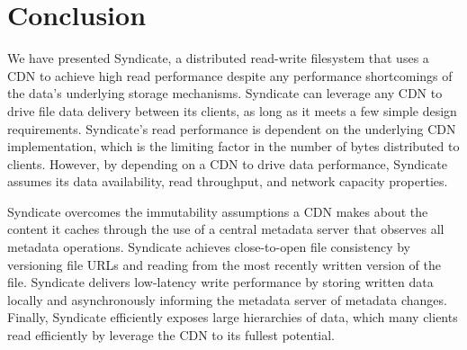\section{Conclusion}

We have presented Syndicate, a distributed read-write filesystem
that uses a CDN to achieve high read performance despite any performance
shortcomings of the data's underlying storage mechanisms.  Syndicate can
leverage any CDN to drive file data delivery between its clients, as long 
as it meets a few simple design requirements.  Syndicate's read performance
is dependent on the underlying CDN implementation, which is the limiting
factor in the number of bytes distributed to clients.  However, by depending
on a CDN to drive data performance, Syndicate assumes its data availability,
read throughput, and network capacity properties.

Syndicate overcomes the immutability assumptions a CDN makes about 
the content it caches through the use of a central metadata server
that observes all metadata operations.  Syndicate achieves close-to-open 
file consistency by versioning file URLs and reading from the most
recently written version of the file.  Syndicate delivers low-latency
write performance by storing written data locally and asynchronously
informing the metadata server of metadata changes.  Finally, Syndicate
 efficiently exposes large hierarchies of data, which many clients
read efficiently by leverage the CDN to its fullest potential.

